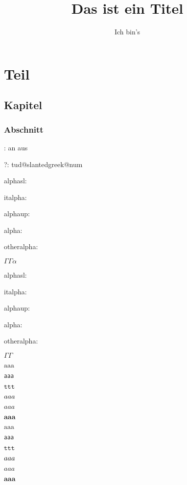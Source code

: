 \documentclass[ngerman,
cdfont=normalbold,
cd=true,
cdfont=ultrabold,
cdfont=false,
tudscrver=2.03,
]{tudscrreprt}
\providecommand{\TUDoptions}[1]{}
\begin{document}
\title{Das ist ein Titel}
\author{Ich bin's}

\makecover
\maketitle
\part{Teil}
\chapter{Kapitel}
\section{Abschnitt}

\makeatletter
\tud@v@comp: 
\if@tud@relspacing
an
\else
aus
\fi




?: \csname tud@slantedgreek@num\endcsname

alphasl: \meaning\alphasl

italpha: \meaning\italpha

alphaup: \meaning\alphaup

alpha: \meaning\alpha

otheralpha: \meaning\otheralpha


$\Gamma\varGamma\alpha$

\TUDoptions{cdfont=true}

alphasl: \meaning\alphasl

italpha: \meaning\italpha

alphaup: \meaning\alphaup

alpha: \meaning\alpha

otheralpha: \meaning\otheralpha


$\Gamma\varGamma$




$\mathrm{aaa}$

$\mathsf{aaa}$

$\mathtt{ttt}$

$\mathnormal{aaa}$

$\mathit{aaa}$

$\mathbf{aaa}$

{
\boldmath
$\mathrm{aaa}$

$\mathsf{aaa}$

$\mathtt{ttt}$

$\mathnormal{aaa}$

$\mathit{aaa}$

$\mathbf{aaa}$
}


\blinddocument



\blindtext\clearpage

\blindmathpaper
\end{document}
